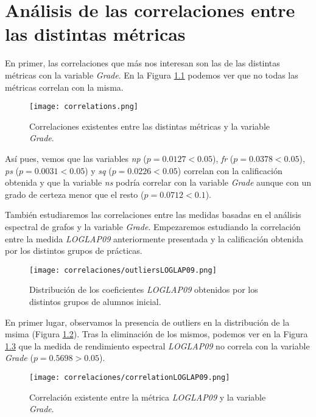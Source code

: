 \chapter{Análisis de las correlaciones entre las distintas métricas}\label{chapter:correlations}

En primer, las correlaciones que más nos interesan son las de las distintas métricas con la variable \emph{Grade}. En la Figura \ref{fig:correlations} podemos ver que no todas las métricas correlan con la misma.

\begin{figure}[H]
    \centering
    \texttt{[image: correlations.png]}
    \caption{Correlaciones existentes entre las distintas métricas y la variable \emph{Grade}.}
    \label{fig:correlations}
\end{figure}

Así pues, vemos que las variables \emph{np} ($p = 0.0127 < 0.05$), \emph{fr} ($p = 0.0378 < 0.05$),    \emph{ps} ($p = 0.0031 < 0.05$) y \emph{sq} ($p = 0.0226 < 0.05$) correlan con la calificación obtenida y que la variable \emph{ns} podría correlar con la variable \emph{Grade} aunque con un grado de certeza menor que el resto ($p = 0.0712 < 0.1$).

También estudiaremos las correlaciones entre las medidas basadas en el análisis espectral de grafos y la variable \emph{Grade}. Empezaremos estudiando la correlación entre la medida \emph{LOGLAP09} anteriormente presentada y la calificación obtenida por los distintos grupos de prácticas.

\begin{figure}[H]
    \centering
    \texttt{[image: correlaciones/outliersLOGLAP09.png]}
    \caption{Distribución de los coeficientes \emph{LOGLAP09} obtenidos por los distintos grupos de alumnos inicial.}
    \label{fig:outliersLOGLAP09}
\end{figure}

En primer lugar, observamos la presencia de outliers en la distribución de la msima (Figura \ref{fig:outliersLOGLAP09}). Tras la eliminación de los mismos, podemos ver en la Figura  \ref{fig:correlationLOGLAP09} que la medida de rendimiento espectral \emph{LOGLAP09} no correla con la variable \emph{Grade} ($p = 0.5698 > 0.05$).

\begin{figure}[H]
    \centering
    \texttt{[image: correlaciones/correlationLOGLAP09.png]}
    \caption{Correlación existente entre la métrica \emph{LOGLAP09} y la variable \emph{Grade}.}
    \label{fig:correlationLOGLAP09}
\end{figure}